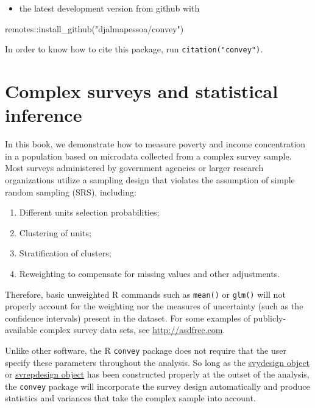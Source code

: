 \documentclass[
]{book}
\newenvironment{Shaded}{\begin{snugshade}}{\end{snugshade}}
\newcommand{\FunctionTok}[1]{\textcolor[rgb]{0.00,0.00,0.00}{#1}}
\newcommand{\NormalTok}[1]{#1}
\newcommand{\SpecialCharTok}[1]{\textcolor[rgb]{0.00,0.00,0.00}{#1}}
\newcommand{\StringTok}[1]{\textcolor[rgb]{0.31,0.60,0.02}{#1}}
\providecommand{\tightlist}{%
  \setlength{\itemsep}{0pt}\setlength{\parskip}{0pt}}
\begin{document}
\begin{itemize}
\tightlist
\item
  the latest development version from github with
\end{itemize}

\begin{Shaded}
\begin{Highlighting}[]
\NormalTok{remotes}\SpecialCharTok{::}\FunctionTok{install\_github}\NormalTok{(}\StringTok{"djalmapessoa/convey"}\NormalTok{)}
\end{Highlighting}
\end{Shaded}

In order to know how to cite this package, run \texttt{citation("convey")}.

\hypertarget{survey}{%
\section{Complex surveys and statistical inference}\label{survey}}

In this book, we demonstrate how to measure poverty and income concentration in a population based on microdata collected from a complex survey sample. Most surveys administered by government agencies or larger research organizations utilize a sampling design that violates the assumption of simple random sampling (SRS), including:

\begin{enumerate}
\def\labelenumi{\arabic{enumi}.}
\tightlist
\item
  Different units selection probabilities;
\item
  Clustering of units;
\item
  Stratification of clusters;
\item
  Reweighting to compensate for missing values and other adjustments.
\end{enumerate}

Therefore, basic unweighted R commands such as \texttt{mean()} or \texttt{glm()} will not properly account for the weighting nor the measures of uncertainty (such as the confidence intervals) present in the dataset. For some examples of publicly-available complex survey data sets, see \href{}{http://asdfree.com}.

Unlike other software, the R \texttt{convey} package does not require that the user specify these parameters throughout the analysis. So long as the \href{http://r-survey.r-forge.r-project.org/survey/html/svydesign.html}{svydesign object} or \href{http://r-survey.r-forge.r-project.org/survey/html/svrepdesign.html}{svrepdesign object} has been constructed properly at the outset of the analysis, the \texttt{convey} package will incorporate the survey design automatically and produce statistics and variances that take the complex sample into account.
\end{document}
